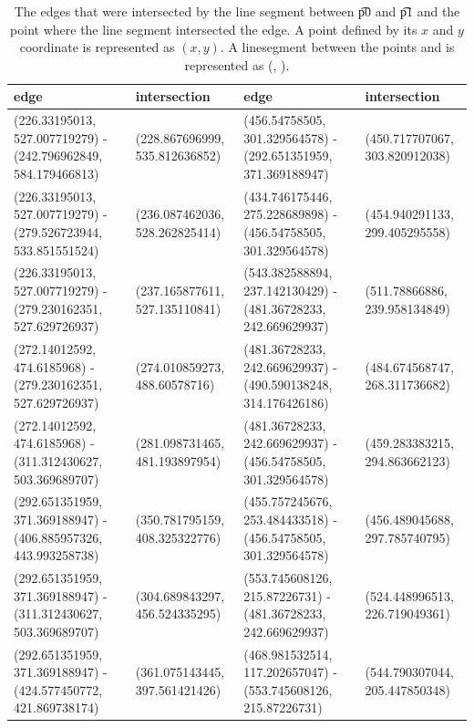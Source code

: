 \begin{table}
	\centering
	\footnotesize{
		\begin{tabular}{ll|ll}
		edge & intersection & edge & intersection\\
		\hline
		(\num{226.33195013}, \num{527.007719279}) - (\num{242.796962849}, \num{584.179466813})	&	(\num{228.867696999}, \num{535.812636852})	&	 (\num{456.54758505}, \num{301.329564578}) - (\num{292.651351959}, \num{371.369188947})	&	(\num{450.717707067}, \num{303.820912038})	\\
		(\num{226.33195013}, \num{527.007719279}) - (\num{279.526723944}, \num{533.851551524})	&	(\num{236.087462036}, \num{528.262825414})	&	 (\num{434.746175446}, \num{275.228689898}) - (\num{456.54758505}, \num{301.329564578})	&	(\num{454.940291133}, \num{299.405295558})	\\ 
		(\num{226.33195013}, \num{527.007719279}) - (\num{279.230162351}, \num{527.629726937})	&	(\num{237.165877611}, \num{527.135110841})	&	 (\num{543.382588894}, \num{237.142130429}) - (\num{481.36728233}, \num{242.669629937})	&	(\num{511.78866886}, \num{239.958134849})	\\ 
		(\num{272.14012592}, \num{474.6185968}) - (\num{279.230162351}, \num{527.629726937})	&	(\num{274.010859273}, \num{488.60578716})	&	 (\num{481.36728233}, \num{242.669629937}) - (\num{490.590138248}, \num{314.176426186})	&	(\num{484.674568747}, \num{268.311736682})	\\ 
		(\num{272.14012592}, \num{474.6185968}) - (\num{311.312430627}, \num{503.369689707})	&	(\num{281.098731465}, \num{481.193897954})	&	 (\num{481.36728233}, \num{242.669629937}) - (\num{456.54758505}, \num{301.329564578})	&	(\num{459.283383215}, \num{294.863662123})	\\ 
		(\num{292.651351959}, \num{371.369188947}) - (\num{406.885957326}, \num{443.993258738})	&	(\num{350.781795159}, \num{408.325322776})	&	 (\num{455.757245676}, \num{253.484433518}) - (\num{456.54758505}, \num{301.329564578})	&	(\num{456.489045688}, \num{297.785740795})	\\ 
		(\num{292.651351959}, \num{371.369188947}) - (\num{311.312430627}, \num{503.369689707})	&	(\num{304.689843297}, \num{456.524335295})	&	 (\num{553.745608126}, \num{215.87226731}) - (\num{481.36728233}, \num{242.669629937})	&	(\num{524.448996513}, \num{226.719049361})	\\ 
		(\num{292.651351959}, \num{371.369188947}) - (\num{424.577450772}, \num{421.869738174})	&	(\num{361.075143445}, \num{397.561421426})	&	 (\num{468.981532514}, \num{117.202657047}) - (\num{553.745608126}, \num{215.87226731})	&	(\num{544.790307044}, \num{205.447850348})	\\	 	
		\end{tabular}
	}
	\caption{The edges that were intersected by the line segment between \t{p0} and \t{p1} and the point where the line segment intersected the edge. A point  defined by its $x$ and $y$ coordinate is represented as $(x, y)$. A linesegment between the points  and  is represented as (, ).}
	\label{tab:c:intersectedEdges}
\end{table}




